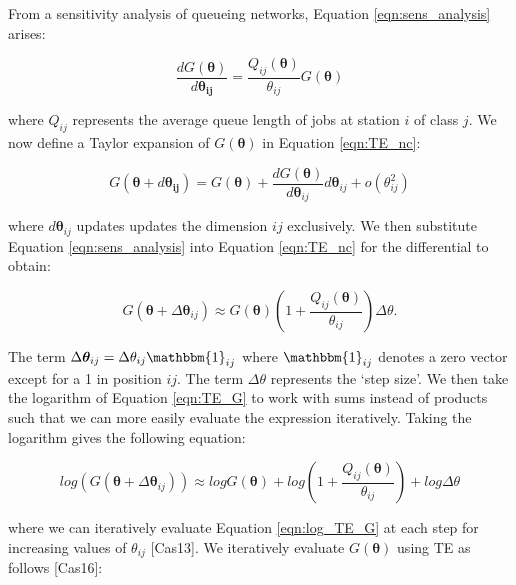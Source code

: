 \documentclass[a4paper,11pt,titlepage]{article}
\begin{document}
From a sensitivity analysis of queueing networks, Equation \ref{eqn:sens_analysis} arises:

\begin{equation}
    \frac{d G(\bm{\theta})}{d \bm{\theta_{ij}}} = \frac{Q_{ij}(\bm{\theta})}{\theta_{ij}} G(\bm{\theta})
    \label{eqn:sens_analysis}
\end{equation}

where $Q_{ij}$ represents the average queue length of jobs at station $i$ of class $j$. We now define a Taylor expansion of $G(\bm{\theta})$ in Equation \ref{eqn:TE_nc}:

\begin{equation}
    G(\bm{\theta} + d \bm{\theta_{ij}}) = G(\bm{\theta}) + \frac{d G(\bm{\theta})}{d \bm{\theta}_{ij}} d\bm{\theta}_{ij} + o(\theta_{ij}^2)
    \label{eqn:TE_nc}
\end{equation}

where $d \bm{\theta}_{ij}$ updates updates the dimension $ij$ exclusively. We then substitute Equation \ref{eqn:sens_analysis} into Equation \ref{eqn:TE_nc} for the differential to obtain: 

\begin{equation}
    G(\bm{\theta} + \Delta \bm{\theta}_{ij}) \approx G(\bm{\theta}) \left(1+\frac{Q_{ij}(\bm{\theta})}{\theta_{ij}}\right) \Delta \theta.
    \label{eqn:TE_G}
\end{equation}

The term $\Delta \bm{\theta}_{ij} = \Delta \theta_{ij} \mathbbm{1}_{ij}$ where $\mathbbm{1}_{ij}$ denotes a zero vector except for a 1 in position $ij$. The term $\Delta \theta$ represents the `step size'. We then take the logarithm of Equation \ref{eqn:TE_G} to work with sums instead of products such that we can more easily evaluate the expression iteratively. Taking the logarithm gives the following equation:

\begin{equation}
    log(G(\bm{\theta} + \Delta \bm{\theta}_{ij})) \approx log G(\bm{\theta}) + log \left(1+\frac{Q_{ij}(\bm{\theta})}{\theta_{ij}}\right) + log \Delta \theta
    \label{eqn:log_TE_G}
\end{equation}

where we can iteratively evaluate Equation \ref{eqn:log_TE_G} at each step for increasing values of $\theta_{ij}$ [Cas13]. We iteratively evaluate $G(\bm{\theta})$ using TE as follows [Cas16]: 
\end{document}
